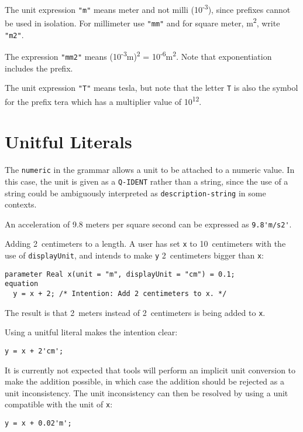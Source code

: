 \begin{example}
The unit expression \lstinline!"m"! means meter and not milli (10\textsuperscript{-3}), since prefixes cannot be used in isolation.
For millimeter use \lstinline!"mm"! and for square meter, m\textsuperscript{2}, write \lstinline!"m2"!.

The expression \lstinline!"mm2"! means (10\textsuperscript{-3}m)\textsuperscript{2} = 10\textsuperscript{-6}m\textsuperscript{2}.
Note that exponentiation includes the prefix.

The unit expression \lstinline!"T"! means tesla, but note that the letter \lstinline!T! is also the symbol for the prefix tera which has a multiplier value of 10\textsuperscript{12}.
\end{example}


\section{Unitful Literals}

The \lstinline[language=grammar]!numeric! in the grammar allows a unit to be attached to a numeric value.
In this case, the unit is given as a \lstinline[language=grammar]!Q-IDENT! rather than a string, since the use of a string could be ambiguously interpreted as \lstinline[language=grammar]!description-string! in some contexts.

\begin{example}
An acceleration of 9.8 meters per square second can be expressed as \lstinline!9.8'm/s2'!.
\end{example}

\begin{example}
Adding 2~centimeters to a length.
A user has set \lstinline!x! to 10~centimeters with the use of \lstinline!displayUnit!, and intends to make \lstinline!y! 2~centimeters bigger than \lstinline!x!:
\begin{lstlisting}[language=modelica]
  parameter Real x(unit = "m", displayUnit = "cm") = 0.1;
equation
  y = x + 2; /* Intention: Add 2 centimeters to x. */
\end{lstlisting}
The result is that 2~meters instead of 2~centimeters is being added to \lstinline!x!.

Using a unitful literal makes the intention clear:
\begin{lstlisting}[language=modelica]
  y = x + 2'cm';
\end{lstlisting}
It is currently not expected that tools will perform an implicit unit conversion to make the addition possible, in which case the addition should be rejected as a unit inconsistency.
The unit inconsistency can then be resolved by using a unit compatible with the unit of \lstinline!x!:
\begin{lstlisting}[language=modelica]
  y = x + 0.02'm';
\end{lstlisting}
\end{example}
